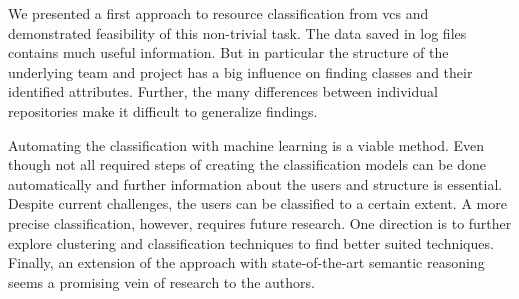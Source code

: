 



We presented a first approach to resource classification from \gls*{vcs} and demonstrated feasibility of this non-trivial task. The data saved in log files contains much useful information. But in particular the structure of the underlying team and project has a big influence on finding classes and their identified attributes. Further, the many differences between individual repositories make it difficult to generalize findings.

Automating the classification with machine learning is a viable method. Even though not all required steps of creating the classification models can be done automatically and further information about the users and structure is essential. Despite current challenges, the users can be classified to a certain extent. A more precise classification, however, requires future research. One direction is to further explore clustering and classification techniques to find better suited techniques. Finally, an extension of the approach with state-of-the-art semantic reasoning seems a promising vein of research to the authors.